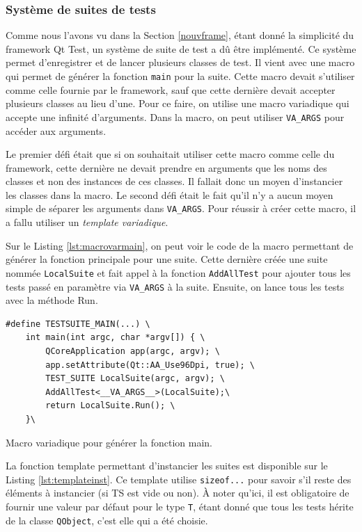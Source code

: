 \documentclass[a4paper]{article}
\begin{document}
\subsubsection*{Système de suites de tests}

Comme nous l'avons vu dans la Section \ref{nouvframe}, étant donné la simplicité
du framework Qt Test, un système de suite de test a dû être implémenté. Ce
système permet d'enregistrer et de lancer plusieurs classes de test. Il vient
avec une macro qui permet de générer la fonction \verb|main| pour la suite.
Cette macro devait s'utiliser comme celle fournie par le framework, sauf que
cette dernière devait accepter plusieurs classes au lieu d'une. Pour ce faire, on
utilise une macro variadique qui accepte une infinité d'arguments. Dans la
macro, on peut utiliser \verb|VA_ARGS| pour accéder aux arguments.

Le premier défi était que si on souhaitait utiliser cette macro comme celle du
framework, cette dernière ne devait prendre en arguments que les noms des
classes et non des instances de ces classes. Il fallait donc un moyen
d'instancier les classes dans la macro. Le second défi était le fait qu'il n'y a
aucun moyen simple de séparer les arguments dans \verb|VA_ARGS|. Pour réussir à
créer cette macro, il a fallu utiliser un \textit{template variadique}.

Sur le Listing \ref{lst:macrovarmain}, on peut voir le code de la macro
permettant de générer la fonction principale pour une suite. Cette dernière créée
une suite nommée \verb|LocalSuite| et fait appel à la fonction \verb|AddAllTest|
pour ajouter tous les tests passé en paramètre via \verb|VA_ARGS| à la suite.
Ensuite, on lance tous les tests avec la méthode Run.

\begin{listing}[ht!]
\begin{verbatim}
#define TESTSUITE_MAIN(...) \
    int main(int argc, char *argv[]) { \
        QCoreApplication app(argc, argv); \
        app.setAttribute(Qt::AA_Use96Dpi, true); \
        TEST_SUITE LocalSuite(argc, argv); \
        AddAllTest<__VA_ARGS__>(LocalSuite);\
        return LocalSuite.Run(); \
    }\
\end{verbatim}
\caption{Macro variadique pour générer la fonction main.}
\label{lst:macrovarmain}
\end{listing}

La fonction template permettant d'instancier les suites est disponible sur le
Listing \ref{lst:templateinst}. Ce template utilise \verb|sizeof...| pour savoir
s'il reste des éléments à instancier (si TS est vide ou non). À noter qu'ici, il
est obligatoire de fournir une valeur par défaut pour le type \verb|T|, étant
donné que tous les tests hérite de la classe \verb|QObject|, c'est elle qui a
été choisie.
\end{document}
